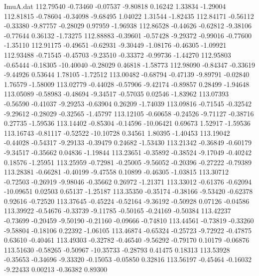 \begin{filecontents}{ImuA.dat}
 112.79540   -0.73460   -0.07537   -9.80818    0.16242    1.33834   -1.29004
 112.81815   -0.78604   -0.34098   -9.68495    1.04022    1.31544   -1.82435
 112.84171   -0.56112   -0.33380   -9.87757   -0.28029    0.97959   -1.96938
 112.86528   -0.44626   -0.62812   -9.38106   -0.77644    0.36132   -1.73275
 112.88883   -0.39601   -0.57428   -9.29372   -0.99016   -0.77600   -1.35110
 112.91175   -0.49651   -0.62931   -9.30449   -1.08176   -0.46305   -1.09921
 112.93488   -0.71545   -0.45703   -9.23510   -0.33372   -0.99736   -1.44270
 112.95803   -0.65444   -0.18305  -10.40040   -0.28029    0.46818   -1.58773
 112.98090   -0.84347   -0.33619   -9.44926    0.53644    1.78105   -1.72512
 113.00482   -0.68794   -0.47139   -9.89791   -0.02840    1.76579   -1.58009
 113.02779   -0.44028   -0.57906   -9.42174   -0.89857    0.28499   -1.94648
 113.05089   -0.58983   -0.48694   -9.34517   -0.57035    0.02546   -1.83962
 113.07393   -0.56590   -0.41037   -9.29253   -0.63904    0.26209   -1.74039
 113.09816   -0.71545   -0.32542   -9.29612   -0.28029   -0.32565   -1.45797
 113.12105   -0.60658   -0.24526   -9.71127   -0.38716    0.27735   -1.59536
 113.14402   -0.85304   -0.14596  -10.06421    0.69673    1.52917   -1.59536
 113.16743   -0.81117   -0.52522  -10.10728    0.34561    1.80395   -1.40453
 113.19042   -0.44028   -0.54317   -9.29133   -0.39479    0.24682   -1.53430
 113.21342   -0.36849   -0.60179   -9.34517   -0.35662    0.04836   -1.19844
 113.23651   -0.35892   -0.38524   -9.17049   -0.40242    0.18576   -1.25951
 113.25959   -0.72981   -0.25005   -9.56052   -0.20396   -0.27222   -0.79389
 113.28381   -0.66281   -0.40199   -9.47558    0.10899   -0.46305   -1.03815
 113.30712   -0.72503   -0.26919   -9.98046   -0.35662    0.26972   -1.21371
 113.33012   -0.61376   -0.62094  -10.09651    0.02503    0.65137   -1.25187
 113.35350   -0.35174   -0.38166   -9.53420   -0.62378    0.92616   -0.72520
 113.37645   -0.45224   -0.52164   -9.36192   -0.50928    0.07126   -0.04586
 113.39922   -0.54676   -0.33739   -9.11785   -0.50165   -0.24169   -0.50384
 113.42237   -0.73699   -0.20459   -9.50190   -0.21160   -0.09666   -0.74810
 113.44561   -0.73819   -0.33260   -9.58804   -0.18106    0.22392   -1.06105
 113.46874   -0.65324   -0.25723   -9.72922   -0.47875    0.63610   -0.40461
 113.49303   -0.32782   -0.46540   -9.56292   -0.79170    0.10179   -0.06876
 113.51630   -0.58265   -0.50967  -10.35733   -0.28793    0.41475    0.18313
 113.53928   -0.35653   -0.34696   -9.33320   -0.15053   -0.05850    0.32816
 113.56197   -0.45464   -0.16032   -9.22433    0.00213   -0.36382    0.89300

\end{filecontents}
